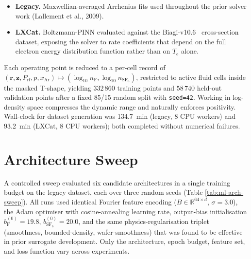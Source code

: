 \begin{itemize}[itemsep=2pt,topsep=2pt]
  \item \textbf{Legacy.} Maxwellian-averaged Arrhenius fits used throughout the
  prior solver work (Lallement et al., 2009).
  \item \textbf{LXCat.} Boltzmann-PINN evaluated against the
  Biagi-v10.6~\cite{biagi2024} cross-section dataset, exposing the solver to
  rate coefficients that depend on the full electron energy distribution
  function rather than on $T_e$ alone.
\end{itemize}

Each operating point is reduced to a per-cell record of
$(\mathbf{r}, \mathbf{z}, P_\mathrm{rf}, p, x_\mathrm{Ar}) \mapsto (\log_{10}
n_\mathrm{F}, \log_{10} n_{\mathrm{SF}_6})$, restricted to active fluid cells
inside the masked T-shape, yielding $332\,860$ training points and $58\,740$
held-out validation points after a fixed 85/15 random split with
\texttt{seed=42}. Working in log-density space compresses the dynamic range and
naturally enforces positivity. Wall-clock for dataset generation was
\SI{134.7}{\minute} (legacy, 8 CPU workers) and \SI{93.2}{\minute} (LXCat, 8 CPU
workers); both completed without numerical failures.

\section{Architecture Sweep}
\label{sec:ml-arch-sweep}

A controlled sweep evaluated six candidate architectures in a single training
budget on the legacy dataset, each over three random seeds (Table
\ref{tab:ml-arch-sweep}). All runs used identical Fourier feature encoding
($B \in \mathbb{R}^{64\times d}$, $\sigma=3.0$), the Adam optimiser with
cosine-annealing learning rate, output-bias initialisation
$b_\mathrm{F}^{(0)}=19.8$, $b_{\mathrm{SF}_6}^{(0)}=20.0$, and the same
physics-regularisation triplet (smoothness, bounded-density, wafer-smoothness)
that was found to be effective in prior surrogate development. Only the
architecture, epoch budget, feature set, and loss function vary across
experiments.


